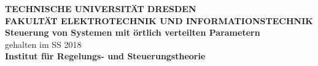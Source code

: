 

\pagestyle{empty}

\begin{center}
	\Large \textbf{TECHNISCHE UNIVERSITÄT DRESDEN \\ \vspace{1.5cm} FAKULTÄT ELEKTROTECHNIK UND INFORMATIONSTECHNIK\\ \vspace{4cm}
 {\Huge Steuerung von Systemen mit örtlich verteilten Parametern}}\\
	\vspace{4cm}
	gehalten im SS 2018 \\ \vspace{1cm}
 \textbf{Institut für Regelungs- und Steuerungstheorie}\\
\vspace{2cm}

\end{center}
\newpage